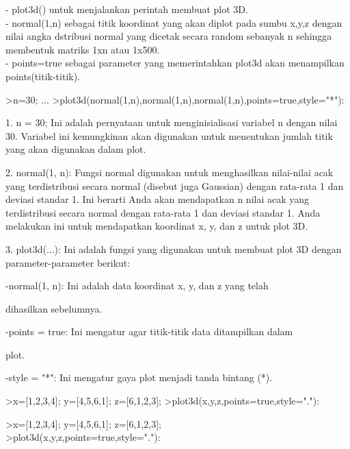 \documentclass{article}
\begin{document}
\begin{eulernotebook}
\begin{eulercomment}
\begin{eulercomment}
\begin{eulercomment}
\begin{eulercomment}
\begin{eulercomment}
- plot3d() untuk menjalankan perintah membuat plot 3D.\\
- normal(1,n) sebagai titik koordinat yang akan diplot pada sumbu
x,y,z dengan nilai angka dstribusi normal yang dicetak secara random
sebanyak n sehingga membentuk matriks 1xn atau 1x500.\\
- points=true sebagai parameter yang memerintahkan plot3d akan
menampilkan points(titik-titik).

\end{eulercomment}
\begin{eulerprompt}
>n=30; ...
>plot3d(normal(1,n),normal(1,n),normal(1,n),points=true,style="*"):
\end{eulerprompt}
\begin{eulercomment}
1. n = 30; Ini adalah pernyataan untuk menginisialisasi variabel n
dengan nilai 30. Variabel ini kemungkinan akan digunakan untuk
menentukan jumlah titik yang akan digunakan dalam plot.

2. normal(1, n): Fungsi normal digunakan untuk menghasilkan
nilai-nilai acak yang terdistribusi secara normal (disebut juga
Gaussian) dengan rata-rata 1 dan deviasi standar 1. Ini berarti Anda
akan mendapatkan n nilai acak yang terdistribusi secara normal dengan
rata-rata 1 dan deviasi standar 1. Anda melakukan ini untuk
mendapatkan koordinat x, y, dan z untuk plot 3D.

3. plot3d(...): Ini adalah fungsi yang digunakan untuk membuat plot 3D
dengan parameter-parameter berikut:

\end{eulercomment}
\begin{eulerttcomment}
 -normal(1, n): Ini adalah data koordinat x, y, dan z yang telah
\end{eulerttcomment}
\begin{eulercomment}
dihasilkan sebelumnya.\\
\end{eulercomment}
\begin{eulerttcomment}
 -points = true: Ini mengatur agar titik-titik data ditampilkan dalam
\end{eulerttcomment}
\begin{eulercomment}
plot.\\
\end{eulercomment}
\begin{eulerttcomment}
 -style = "*": Ini mengatur gaya plot menjadi tanda bintang (*).
\end{eulerttcomment}
\begin{eulerprompt}
>x=[1,2,3,4]; y=[4,5,6,1]; z=[6,1,2,3];
>plot3d(x,y,z,points=true,style="."):
\end{eulerprompt}
\begin{eulercomment}
\textgreater{}x=[1,2,3,4]; y=[4,5,6,1]; z=[6,1,2,3];\\
\textgreater{}plot3d(x,y,z,points=true,style="."):


\end{eulercomment}
\end{eulercomment}
\end{eulercomment}
\end{eulercomment}
\end{eulercomment}
\end{eulernotebook}
\end{document}
